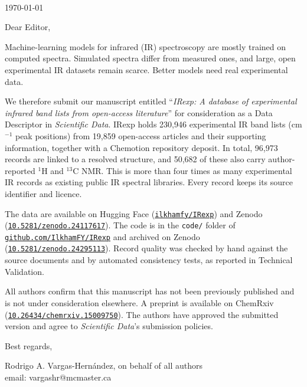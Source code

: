 \documentclass{article}
\begin{document}
$\;$\\
\vspace{-0.3cm}

\begin{flushright}
\today
\end{flushright}

\vspace{-0.1cm}
Dear Editor,\\
\vspace{0.2cm}


Machine-learning models for infrared (IR) spectroscopy are mostly trained on computed spectra. Simulated spectra differ from measured ones, and large, open experimental IR datasets remain scarce. Better models need real experimental data.

We therefore submit our manuscript entitled ``\emph{IRexp: A database of experimental infrared band lists from open-access literature}'' for consideration as a Data Descriptor in \emph{Scientific Data}.
IRexp holds 230{,}946 experimental IR band lists (cm$^{-1}$ peak positions) from 19{,}859 open-access articles and their supporting information, together with a Chemotion repository deposit.
In total, 96{,}973 records are linked to a resolved structure, and 50{,}682 of these also carry author-reported $^{1}$H and $^{13}$C NMR.
This is more than four times as many experimental IR records as existing public IR spectral libraries. Every record keeps its source identifier and licence.

The data are available on Hugging Face (\href{https://huggingface.co/datasets/ilkhamfy/IRexp}{\texttt{ilkhamfy/IRexp}}) and Zenodo (\href{https://doi.org/10.5281/zenodo.24117617}{\texttt{10.5281/\linebreak[0]zenodo.24117617}}).
The code is in the \texttt{code/} folder of \href{https://github.com/IlkhamFY/IRexp}{\texttt{github.com/\linebreak[0]IlkhamFY/IRexp}} and archived on Zenodo (\href{https://doi.org/10.5281/zenodo.24295113}{\texttt{10.5281/\linebreak[0]zenodo.24295113}}).
Record quality was checked by hand against the source documents and by automated consistency tests, as reported in Technical Validation.

All authors confirm that this manuscript has not been previously published and is not under consideration elsewhere. A preprint is available on ChemRxiv (\href{https://doi.org/10.26434/chemrxiv.15009750}{\texttt{10.26434/\linebreak[0]chemrxiv.15009750}}). The authors have approved the submitted version and agree to \emph{Scientific Data}'s submission policies.

\vspace{0.5cm}

Best regards,\vspace{0.5cm}\\
\begin{center}
Rodrigo A. Vargas-Hern\'{a}ndez, on behalf of all authors \\
email: vargashr@mcmaster.ca
\end{center}
\end{document}
